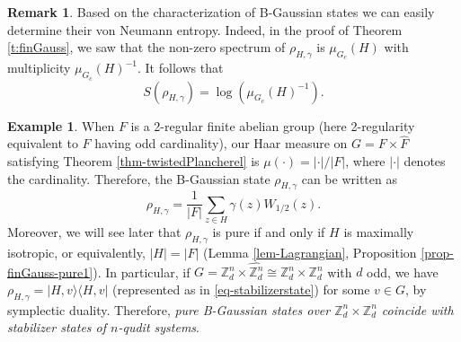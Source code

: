 \documentclass[12pt,reqno]{amsart}
\theoremstyle{definition}
\newtheorem{ex}[thm]{Example}
\theoremstyle{definition}
\theoremstyle{definition}
\newtheorem{rem}[thm]{Remark}
\numberwithin{thm}{section}
\numberwithin{equation}{section}
\newcommand{\la}{\langle}
\newcommand{\ra}{\rangle}
\newcommand{\z}{\mathbb{Z}}
\begin{document}
\begin{rem}
Based on the characterization of B-Gaussian states we can easily determine their von Neumann entropy. Indeed, in the proof of Theorem \ref{t:finGauss}, we saw that the non-zero spectrum of $\rho_{H,\gamma}$ is $\mu_{G_c}(H)$ with multiplicity $\mu_{G_c}(H)^{-1}$. It follows that
    \begin{equation}\label{eq-entropyformula}
        S(\rho_{H,\gamma}) = \log(\mu_{G_c}(H)^{-1}).   
    \end{equation}
\end{rem}


\begin{ex} \label{ex-discrete}
When $F$ is a 2-regular finite abelian group (here 2-regularity equivalent to $F$ having odd cardinality), our Haar measure on $G=F\times \widehat{F}$ satisfying Theorem \ref{thm-twistedPlancherel} is $\mu(\cdot)=|\cdot|/|F|$, where $|\cdot|$ denotes the cardinality. Therefore, the B-Gaussian state $\rho_{H,\gamma}$ can be written as 
    $$\rho_{H,\gamma}=\frac{1}{|F|}\sum_{z\in H}\gamma(z)W_{1/2}(z).$$
Moreover, we will see later that $\rho_{H,\gamma}$ is pure if and only if $H$ is maximally isotropic, or equivalently, $|H|=|F|$ (Lemma \ref{lem-Lagrangian}, Proposition \ref{prop-finGauss-pure1}). In particular, if $G=\z_d^n\times \widehat{\z_d^n}\cong \z_d^n\times {\z_d^n}$ with $d$ odd, we have $\rho_{H,\gamma}=|H,v\ra\la H,v|$ (represented as in \eqref{eq-stabilizerstate}) for some $v\in G$, by  symplectic duality. Therefore, \textit{pure B-Gaussian states over $\z_d^n\times {\z_d^n}$ coincide with stabilizer states of $n$-qudit systems}. 

\end{ex}
\end{document}
